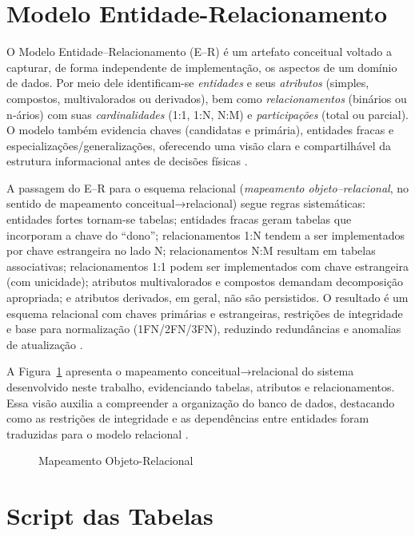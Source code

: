 \section{Modelo Entidade-Relacionamento}

O Modelo Entidade–Relacionamento (E–R) é um artefato conceitual voltado a capturar,
de forma independente de implementação, os aspectos de um domínio de dados. Por meio
dele identificam-se \emph{entidades} e seus \emph{atributos} (simples, compostos,
multivalorados ou derivados), bem como \emph{relacionamentos} (binários ou n‐ários)
com suas \emph{cardinalidades} (1:1, 1:N, N:M) e \emph{participações} (total ou
parcial). O modelo também evidencia chaves (candidatas e primária), entidades fracas
e especializações/generalizações, oferecendo uma visão clara e compartilhável da
estrutura informacional antes de decisões físicas \parencite{Silberschatz2012}.

A passagem do E–R para o esquema relacional (\emph{mapeamento objeto–relacional}, no
sentido de mapeamento conceitual→relacional) segue regras sistemáticas: entidades
fortes tornam-se tabelas; entidades fracas geram tabelas que incorporam a chave do
“dono”; relacionamentos 1:N tendem a ser implementados por chave estrangeira no lado N;
relacionamentos N:M resultam em tabelas associativas; relacionamentos 1:1 podem ser
implementados com chave estrangeira (com unicidade); atributos multivalorados e
compostos demandam decomposição apropriada; e atributos derivados, em geral, não são
persistidos. O resultado é um esquema relacional com chaves primárias e estrangeiras,
restrições de integridade e base para normalização (1FN/2FN/3FN), reduzindo
redundâncias e anomalias de atualização \parencite{Silberschatz2012}.

A Figura~\ref{fig:mapeamento-or} apresenta o mapeamento conceitual→relacional do sistema
desenvolvido neste trabalho, evidenciando tabelas, atributos e relacionamentos. Essa
visão auxilia a compreender a organização do banco de dados, destacando como as
restrições de integridade e as dependências entre entidades foram traduzidas para o
modelo relacional \parencite{Silberschatz2012}.


\begin{figure}[H]
	\caption{Mapeamento Objeto-Relacional}
	\label{fig:mapeamento-or}
	\centering
\end{figure}

\section{Script das Tabelas}

